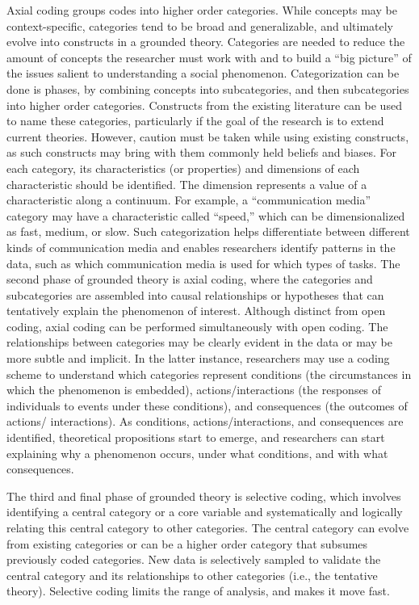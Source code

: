 Axial coding groups codes into higher order categories. While concepts may be context-specific, categories tend to be broad and generalizable, and ultimately evolve into constructs in a grounded theory. Categories are needed to reduce the amount of concepts the researcher must work with and to build a ``big picture'' of the issues salient to understanding a social phenomenon. Categorization can be done is phases, by combining concepts into subcategories, and then subcategories into higher order categories. Constructs from the existing literature can be used to name these categories, particularly if the goal of the research is to extend current theories. However, caution must be taken while using existing constructs, as such constructs may bring with them commonly held beliefs and biases. For each category, its characteristics (or properties) and dimensions of each characteristic should be identified. The dimension represents a value of a characteristic along a continuum. For example, a ``communication media'' category may have a characteristic called ``speed,'' which can be dimensionalized as fast, medium, or slow. Such categorization helps differentiate between different kinds of communication media and enables researchers identify patterns in the data, such as which communication media is used for which types of tasks. The second phase of grounded theory is axial coding, where the categories and subcategories are assembled into causal relationships or hypotheses that can tentatively explain the phenomenon of interest. Although distinct from open coding, axial coding can be performed simultaneously with open coding. The relationships between categories may be clearly evident in the data or may be more subtle and implicit. In the latter instance, researchers may use a coding scheme to understand which categories represent conditions (the circumstances in which the phenomenon is embedded), actions/interactions (the responses of individuals to events under these conditions), and consequences (the outcomes of actions/ interactions). As conditions, actions/interactions, and consequences are identified, theoretical propositions start to emerge, and researchers can start explaining why a phenomenon occurs, under what conditions, and with what consequences.

The third and final phase of grounded theory is selective coding, which involves identifying a central category or a core variable and systematically and logically relating this central category to other categories. The central category can evolve from existing categories or can be a higher order category that subsumes previously coded categories. New data is selectively sampled to validate the central category and its relationships to other categories (i.e., the tentative theory). Selective coding limits the range of analysis, and makes it move fast. 

